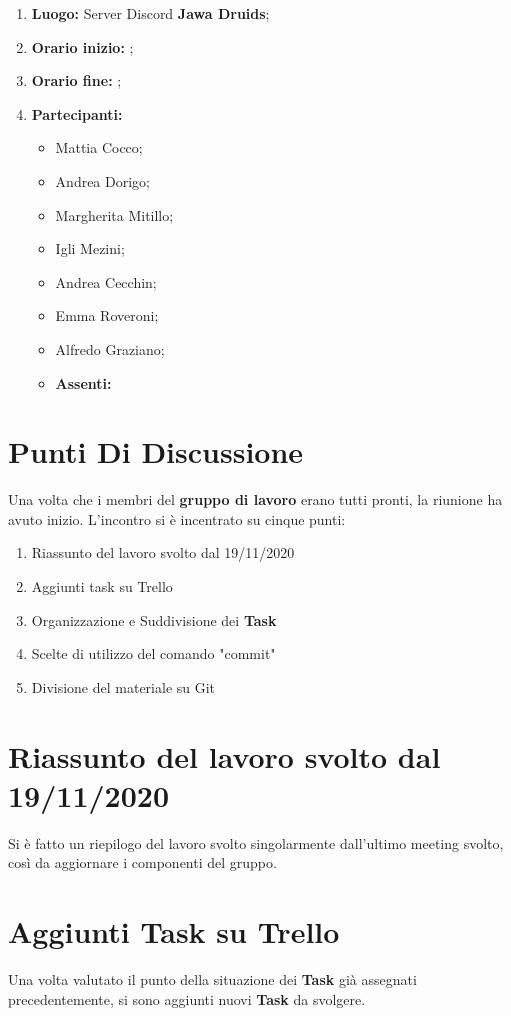 \documentclass[a4paper,12pt]{report}
\begin{document}
	\makeatother
	\begin{enumerate}
		\item \textbf{Luogo:} \normalfont Server Discord \textbf{Jawa Druids};
		\item \textbf{Orario inizio:} ;
		\item \textbf{Orario fine:} ;
		\item \textbf{Partecipanti:}
		\begin{itemize}
			\item Mattia Cocco;
			\item Andrea Dorigo;
			\item Margherita Mitillo;
			\item Igli Mezini;
			\item Andrea Cecchin;
			\item Emma Roveroni;
			\item Alfredo Graziano;
		\end{itemize}
		\begin{itemize}
		\item \textbf{Assenti:}
		\end{itemize}
	\end{enumerate}
	\newpage
	\tableofcontents{}
	\chapter{Punti Di Discussione}	
	Una volta che i membri del \textbf{gruppo di lavoro} erano tutti pronti, la riunione ha avuto inizio.
	L'incontro si è incentrato su cinque punti:
	\begin{enumerate}
		\item Riassunto del lavoro svolto dal 19/11/2020
		\item Aggiunti task su Trello
		\item Organizzazione e Suddivisione dei \textbf{Task}
		\item Scelte di utilizzo del comando "commit"
		\item Divisione del materiale su Git
	\end{enumerate}
	
	\chapter{Riassunto del lavoro svolto dal 19/11/2020}
	Si è fatto un riepilogo del lavoro svolto singolarmente dall'ultimo meeting svolto, così da aggiornare i componenti del gruppo.
	
	\chapter{Aggiunti Task su Trello}
	Una volta valutato il punto della situazione dei \textbf{Task} già assegnati precedentemente, si sono aggiunti nuovi \textbf{Task} da svolgere.
	
\end{document}
